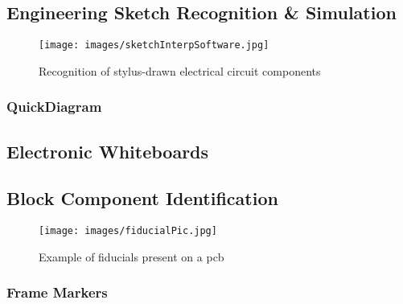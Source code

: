 \subsection{Engineering Sketch Recognition \& Simulation}


\begin{figure}[ht!]
\centering
\texttt{[image: images/sketchInterpSoftware.jpg]}
\caption{Recognition of stylus-drawn electrical circuit components \cite{sketchInterpSoftware}}
\label{im:sketchInterpSoftware}
\end{figure}

\clearpage

\subsubsection{QuickDiagram}



\subsection{Electronic Whiteboards}



\subsection{Block Component Identification}




\begin{figure}[ht!]
\centering
\texttt{[image: images/fiducialPic.jpg]}
\caption{Example of fiducials present on a \gls{pcb} \cite{fiducialPic}}
\label{im:fiducialPic}
\end{figure}

\clearpage



\subsubsection{Frame Markers}
\label{ch:back:borders}



